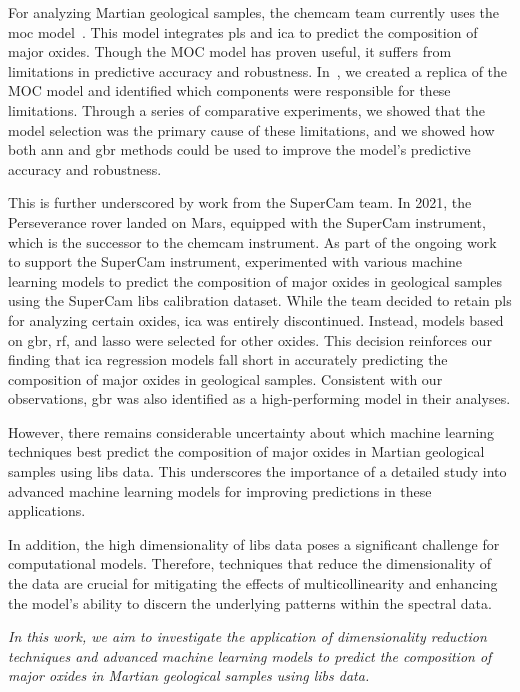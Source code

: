 For analyzing Martian geological samples, the \gls{chemcam} team currently uses the \gls{moc} model~\cite{cleggRecalibrationMarsScience2017}.
This model integrates \gls{pls} and \gls{ica} to predict the composition of major oxides.
Though the MOC model has proven useful, it suffers from limitations in predictive accuracy and robustness.
In~\citet{p9_paper}, we created a replica of the MOC model and identified which components were responsible for these limitations.
Through a series of comparative experiments, we showed that the model selection was the primary cause of these limitations, and we showed how both \gls{ann} and \gls{gbr} methods could be used to improve the model's predictive accuracy and robustness.

This is further underscored by work from the SuperCam team.
In 2021, the Perseverance rover landed on Mars, equipped with the SuperCam instrument, which is the successor to the \gls{chemcam} instrument.
As part of the ongoing work to support the SuperCam instrument, \citet{andersonPostlandingMajorElement2022} experimented with various machine learning models to predict the composition of major oxides in geological samples using the SuperCam \gls{libs} calibration dataset.
While the team decided to retain \gls{pls} for analyzing certain oxides, \gls{ica} was entirely discontinued.
Instead, models based on \gls{gbr}, \gls{rf}, and \gls{lasso} were selected for other oxides.
This decision reinforces our finding that \gls{ica} regression models fall short in accurately predicting the composition of major oxides in geological samples.
Consistent with our observations, \gls{gbr} was also identified as a high-performing model in their analyses.

However, there remains considerable uncertainty about which machine learning techniques best predict the composition of major oxides in Martian geological samples using \gls{libs} data.
This underscores the importance of a detailed study into advanced machine learning models for improving predictions in these applications.

In addition, the high dimensionality of \gls{libs} data poses a significant challenge for computational models.
Therefore, techniques that reduce the dimensionality of the data are crucial for mitigating the effects of multicollinearity and enhancing the model's ability to discern the underlying patterns within the spectral data.

\textit{In this work, we aim to investigate the application of dimensionality reduction techniques and advanced machine learning models to predict the composition of major oxides in Martian geological samples using \gls{libs} data.}